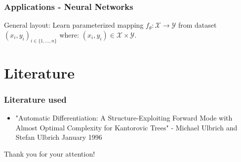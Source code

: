 \documentclass[compress]{beamer}
\begin{document}
\begin{frame}[t]
	\frametitle{Applications - Neural Networks}
	General layout: Learn parameterized mapping
	$f_\theta : \mathcal{X} \to \mathcal{Y}$ from dataset
	$(x_i, y_i)_{i \in \{
				1, \ldots, n
				\} }$
	where:
	$(x_i, y_i) \in \mathcal{X} \times \mathcal{Y}$.
	\vspace{5mm}

	\begin{enumerate}
	\end{enumerate}

\end{frame}

\section{Literature}
\begin{frame}
	\frametitle{Literature used}
	\begin{itemize}
		\item "Automatic Differentiation: A Structure-Exploiting Forward
		      Mode with Almost Optimal Complexity for Kantorovic Trees"
		      - Michael Ulbrich and Stefan Ulbrich January 1996
	\end{itemize}
\end{frame}

\begin{frame}
	\begin{center}
		\Large{Thank you for your attention!}
	\end{center}
\end{frame}
\end{document}
